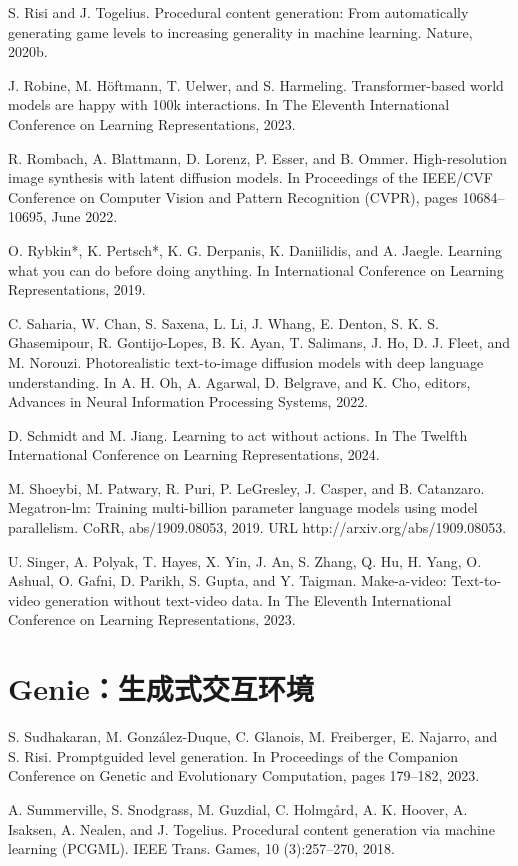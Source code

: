 \documentclass[10pt]{article}
\begin{document}
S. Risi and J. Togelius. Procedural content generation: From automatically generating game levels to increasing generality in machine learning. Nature, 2020b.

J. Robine, M. Höftmann, T. Uelwer, and S. Harmeling. Transformer-based world models are happy with 100k interactions. In The Eleventh International Conference on Learning Representations, 2023.

R. Rombach, A. Blattmann, D. Lorenz, P. Esser, and B. Ommer. High-resolution image synthesis with latent diffusion models. In Proceedings of the IEEE/CVF Conference on Computer Vision and Pattern Recognition (CVPR), pages 10684–10695, June 2022.

O. Rybkin*, K. Pertsch*, K. G. Derpanis, K. Daniilidis, and A. Jaegle. Learning what you can do before doing anything. In International Conference on Learning Representations, 2019.

C. Saharia, W. Chan, S. Saxena, L. Li, J. Whang, E. Denton, S. K. S. Ghasemipour, R. Gontijo-Lopes, B. K. Ayan, T. Salimans, J. Ho, D. J. Fleet, and M. Norouzi. Photorealistic text-to-image diffusion models with deep language understanding. In A. H. Oh, A. Agarwal, D. Belgrave, and K. Cho, editors, Advances in Neural Information Processing Systems, 2022.

D. Schmidt and M. Jiang. Learning to act without actions. In The Twelfth International Conference on Learning Representations, 2024.

M. Shoeybi, M. Patwary, R. Puri, P. LeGresley, J. Casper, and B. Catanzaro. Megatron-lm: Training multi-billion parameter language models using model parallelism. CoRR, abs/1909.08053, 2019. URL http://arxiv.org/abs/1909.08053.

U. Singer, A. Polyak, T. Hayes, X. Yin, J. An, S. Zhang, Q. Hu, H. Yang, O. Ashual, O. Gafni, D. Parikh, S. Gupta, and Y. Taigman. Make-a-video: Text-to-video generation without text-video data. In The Eleventh International Conference on Learning Representations, 2023.

\section*{Genie：生成式交互环境}
S. Sudhakaran, M. González-Duque, C. Glanois, M. Freiberger, E. Najarro, and S. Risi. Promptguided level generation. In Proceedings of the Companion Conference on Genetic and Evolutionary Computation, pages 179–182, 2023.

A. Summerville, S. Snodgrass, M. Guzdial, C. Holmgård, A. K. Hoover, A. Isaksen, A. Nealen, and J. Togelius. Procedural content generation via machine learning (PCGML). IEEE Trans. Games, 10 (3):257–270, 2018.
\end{document}
